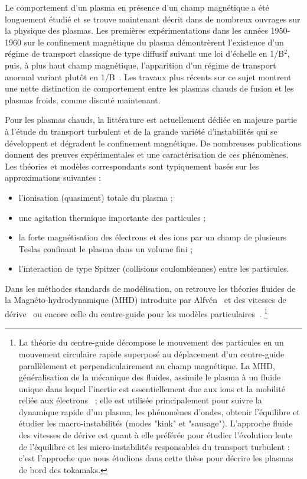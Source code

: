 \begin{refsection}
Le comportement d'un plasma en présence d'un champ magnétique a été
longuement étudié et se trouve maintenant décrit dans de nombreux ouvrages sur
la physique des plasmas.
Les premières expérimentations dans les années 1950-1960 sur le confinement
magnétique du plasma démontrèrent l'existence d'un régime de transport classique
de type diffusif suivant une loi d'échelle en 1/B$^2$, puis, à plus haut champ
magnétique, l'apparition d'un régime de transport anormal variant plutôt en
1/B~\parencite{Bohm,Simon55,Yoshikawa,Janes,Rozhansky}. Les travaux plus
récents sur ce sujet montrent une nette distinction de
comportement entre les plasmas chauds de fusion et les plasmas froids, comme
discuté maintenant.

Pour les plasmas chauds, la littérature est actuellement dédiée en majeure
partie à l'étude du transport turbulent et de la grande variété d'instabilités qui
se développent et dégradent le confinement magnétique. De nombreuses
publications donnent des preuves expérimentales et une caractérisation de ces
phénomènes. Les théories et modèles correspondants sont typiquement basés sur
les approximations suivantes :

\begin{itemize}
  \item l'ionisation (quasiment) totale du plasma ;
  \item une agitation thermique importante des particules ;
  \item la forte magnétisation des électrons et des ions par un champ de
  plusieurs Teslas confinant le plasma dans un volume fini ;
  \item l'interaction de type Spitzer (collisions coulombiennes) entre les
  particules.
\end{itemize}

Dans les méthodes standards de modélisation, on retrouve les théories fluides de
la Magnéto-hydrodynamique
 (MHD) introduite
par Alfvén~\parencite{Alfven} et des vitesses de dérive~\parencite{SarazinPhD}
ou encore celle du centre-guide pour les modèles
particulaires~\parencite{Taylor,Lee,Garbet10}.
\footnote{La
théorie du centre-guide décompose le mouvement des particules en un mouvement
circulaire rapide superposé au déplacement d'un centre-guide parallèlement et
perpendiculairement au champ magnétique. La MHD, généralisation de la mécanique
des fluides, assimile le plasma à un fluide unique dans lequel l'inertie est
essentiellement due aux ions et la mobilité reliée aux
électrons~\parencite{Rax} ; elle est utilisée principalement pour suivre
la dynamique rapide d'un plasma, les phénomènes d'ondes, obtenir l'équilibre et
 étudier les macro-instabilités (modes "kink" et "sausage").
L'approche fluide des vitesses de dérive est quant à elle préférée pour étudier
l'évolution lente de l'équilibre et les micro-instabilités responsables du
transport turbulent : c'est l'approche que nous étudions dans cette thèse pour décrire les plasmas de bord des tokamaks.}


\end{refsection}

